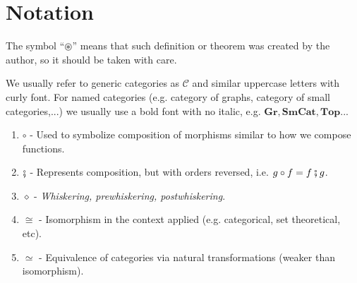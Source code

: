 \chapter*{Notation}

The symbol ``$\circledast$'' means that such definition or theorem was
created by the author, so it should be taken with care.

We usually refer to generic categories as $\mathcal C$ and similar uppercase letters with
curly font. For named categories (e.g. category of graphs, category of small categories,...)
we usually use a bold font with no italic, e.g. $\mathbf{Gr}, \mathbf{SmCat}, \mathbf{Top}$...

\begin{enumerate}
	\item $\circ$ - Used to symbolize composition of morphisms similar to how we compose functions.
	\item $\fatsemi$ - Represents composition, but with orders reversed, i.e. $g\circ f = f \fatsemi g$.
	\item $\diamond$ - \textit{Whiskering, prewhiskering, postwhiskering}.
	\item $\cong$ - Isomorphism in the context applied (e.g. categorical, set theoretical, etc).
	\item $\simeq$ - Equivalence of categories via natural transformations (weaker than isomorphism).
\end{enumerate}


